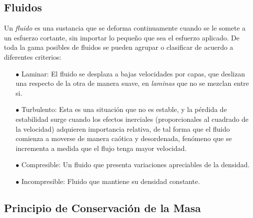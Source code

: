 \documentclass[a4paper,10pt, oneside]{book}
\begin{document}
\subsection{Fluidos}

Un \textit{fluido} es una sustancia que se deforma continuamente cuando se le somete a un esfuerzo cortante, sin importar lo pequeño que sea el esfuerzo aplicado. De toda la gama posibles de fluidos se pueden agrupar o clasificar de acuerdo a diferentes criterios:

\begin{itemize}
	\item[$\bullet$] Laminar: El fluido se desplaza a bajas velocidades por capas, que deslizan una respecto de la otra de manera suave, en \textit{laminas} que no se mezclan entre si.
	\item[$\bullet$] Turbulento: Esta es una situación que no es estable, y la pérdida de estabilidad surge cuando los efectos inerciales (proporcionales al cuadrado de la velocidad) adquieren importancia relativa, de tal forma que el fluido comienza a moverse de manera caótica y desordenada, fenómeno que se incrementa a medida que el flujo tenga mayor velocidad.
	\item[$\bullet$] Compresible: Un fluido que presenta variaciones apreciables de la densidad.
	\item[$\bullet$] Incompresible: Fluido que mantiene su densidad constante.
\end{itemize}

\subsection{Principio de Conservación de la Masa}
\end{document}
